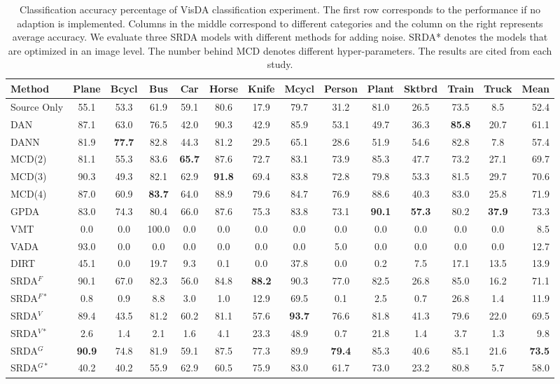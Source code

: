 \documentclass[journal,twocolumn]{IEEEtran}
\theoremstyle{definition}
\begin{document}
\begin{table*}[htbp]
\centering
\caption{Classification accuracy percentage of VisDA classification experiment. The first row corresponds to the performance if no adaption is implemented. Columns in the middle correspond to different categories and the column on the right represents average accuracy. We evaluate three SRDA models with different methods for adding noise. SRDA* denotes the models that are optimized in an image level. The number behind MCD denotes different hyper-parameters. The results are cited from each study.}
\label{tab:visda}
\begin{tabular}{l|cccccccccccc|r}
\hline\hline
Method&Plane&Bcycl&Bus&Car&Horse&Knife&Mcycl&Person&Plant&Sktbrd&Train&Truck&Mean\\
\hline
Source Only&55.1&53.3 &61.9 &59.1&80.6&17.9&79.7&31.2&81.0&26.5&73.5&8.5&52.4\\
\hline
DAN~\cite{pmlr-v37-long15}&87.1&63.0&76.5&42.0&90.3&42.9&85.9&53.1&49.7&
36.3&{\bf 85.8}&20.7&61.1\\
DANN~\cite{ganin2016domain}&81.9&{\bf 77.7}&82.8&44.3&81.2&29.5&65.1&28.6&
51.9&54.6&82.8&7.8&57.4\\
MCD($2$)~\cite{saito2018maximum}&81.1&55.3&83.6&{\bf 65.7}&87.6&72.7&83.1&73.9&85.3&
47.7&73.2&27.1&69.7\\
MCD($3$)~\cite{saito2018maximum}&90.3&49.3&82.1&62.9&{\bf 91.8}&69.4&83.8&72.8&79.8&
53.3&81.5&29.7&70.6\\
MCD($4$)~\cite{saito2018maximum}&87.0&60.9&{\bf 83.7}&64.0&88.9&79.6&84.7&76.9&88.6&
40.3&83.0&25.8&71.9\\
GPDA~\cite{8953535}&83.0&74.3&80.4&66.0&87.6&75.3&83.8&73.1&{\bf 90.1}&
{\bf 57.3}&80.2&{\bf 37.9}&73.3\\
\hline
VMT~\cite{mao2019virtual}&0.0&0.0&100.0&0.0&0.0&0.0&0.0&0.0&
0.0&0.0&0.0&0.0&8.5\\
VADA~\cite{shu2018a}&93.0&0.0&0.0&0.0&0.0&0.0&0.0&5.0&
0.0&0.0&0.0&0.0&12.7\\
DIRT~\cite{shu2018a}&45.1&0.0&19.7&9.3&0.1&0.0&37.8&0.0&
0.2&7.5&17.1&13.5&13.9\\
\hline
SRDA$^F$&90.1&67.0&82.3&56.0&84.8&{\bf 88.2}&90.3&77.0&
82.5&26.8&85.0&16.2&71.1\\
SRDA$^{F*}$&0.8&0.9&8.8&3.0&1.0&12.9&69.5&0.1&
2.5&0.7&26.8&1.4&11.9\\
SRDA$^V$&89.4&43.5&81.2&60.2&81.1&57.6&{\bf 93.7}&76.6&
81.8&41.3&79.6&22.0&69.5\\
SRDA$^{V*}$&2.6&1.4&2.1&1.6&4.1&23.3&48.9&0.7&
21.8&1.4&3.7&1.3&9.8\\
SRDA$^G$&{\bf 90.9}&74.8&81.9&59.1&87.5&77.3&89.9&{\bf 79.4}&
85.3&40.6&85.1&21.6&{\bf 73.5}\\
SRDA$^{G*}$&40.2&40.2&55.9&62.9&60.5&75.9&83.0&61.7&
73.0&23.2&80.8&5.7&58.0\\
\hline\hline
\end{tabular}
\end{table*}
\end{document}
